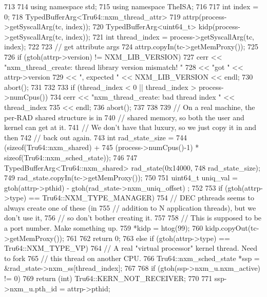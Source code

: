 \begin{DoxyCode}
713     {
714         using namespace std;
715         using namespace TheISA;
716 
717         int index = 0;
718         TypedBufferArg<Tru64::nxm_thread_attr>
719             attrp(process->getSyscallArg(tc, index));
720         TypedBufferArg<uint64_t> kidp(process->getSyscallArg(tc, index));
721         int thread_index = process->getSyscallArg(tc, index);
722 
723         // get attribute args
724         attrp.copyIn(tc->getMemProxy());
725 
726         if (gtoh(attrp->version) != NXM_LIB_VERSION) {
727             cerr << "nxm_thread_create: thread library version mismatch! "
728                  << "got " << attrp->version
729                  << ", expected " << NXM_LIB_VERSION << endl;
730             abort();
731         }
732 
733         if (thread_index < 0 || thread_index > process->numCpus()) {
734             cerr << "nxm_thread_create: bad thread index " << thread_index
735                  << endl;
736             abort();
737         }
738 
739         // On a real machine, the per-RAD shared structure is in
740         // shared memory, so both the user and kernel can get at it.
741         // We don't have that luxury, so we just copy it in and then
742         // back out again.
743         int rad_state_size =
744             (sizeof(Tru64::nxm_shared) +
745              (process->numCpus()-1) * sizeof(Tru64::nxm_sched_state));
746 
747         TypedBufferArg<Tru64::nxm_shared> rad_state(0x14000,
748                                                     rad_state_size);
749         rad_state.copyIn(tc->getMemProxy());
750 
751         uint64_t uniq_val = gtoh(attrp->pthid) - gtoh(rad_state->nxm_uniq_offset)
      ;
752 
753         if (gtoh(attrp->type) == Tru64::NXM_TYPE_MANAGER) {
754             // DEC pthreads seems to always create one of these (in
755             // addition to N application threads), but we don't use it,
756             // so don't bother creating it.
757 
758             // This is supposed to be a port number.  Make something up.
759             *kidp = htog(99);
760             kidp.copyOut(tc->getMemProxy());
761 
762             return 0;
763         } else if (gtoh(attrp->type) == Tru64::NXM_TYPE_VP) {
764             // A real "virtual processor" kernel thread.  Need to fork
765             // this thread on another CPU.
766             Tru64::nxm_sched_state *ssp = &rad_state->nxm_ss[thread_index];
767 
768             if (gtoh(ssp->nxm_u.nxm_active) != 0)
769                 return (int) Tru64::KERN_NOT_RECEIVER;
770 
771             ssp->nxm_u.pth_id = attrp->pthid;
}}
\end{DoxyCode}
